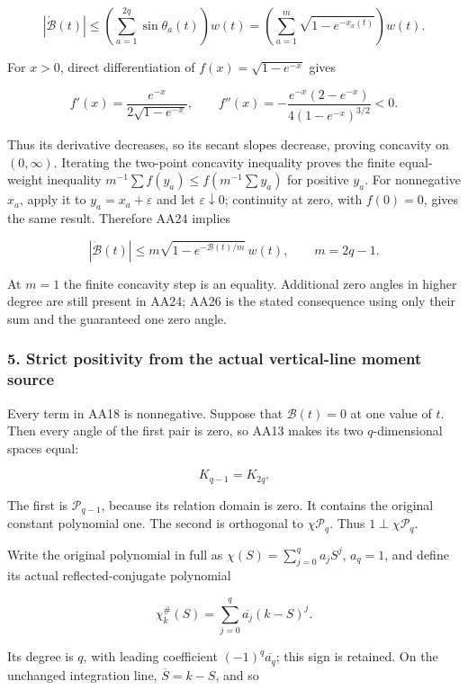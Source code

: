 \[
|\dot{\mathcal B}(t)|
\le\left(\sum_{a=1}^{2q}\sin\theta_a(t)\right)w(t)
=\left(\sum_{a=1}^{m}\sqrt{1-e^{-x_a(t)}}\right)w(t).
\tag{AA24}
\]

For \(x>0\), direct differentiation of \(f(x)=\sqrt{1-e^{-x}}\) gives

\[
f'(x)=\frac{e^{-x}}{2\sqrt{1-e^{-x}}},\qquad
f''(x)=-\frac{e^{-x}(2-e^{-x})}{4(1-e^{-x})^{3/2}}<0.
\tag{AA25}
\]

Thus its derivative decreases, so its secant slopes decrease, proving concavity on \((0,\infty)\). Iterating the two-point concavity inequality proves the finite equal-weight inequality \(m^{-1}\sum f(y_a)\le f(m^{-1}\sum y_a)\) for positive \(y_a\). For nonnegative \(x_a\), apply it to \(y_a=x_a+\varepsilon\) and let \(\varepsilon\downarrow0\); continuity at zero, with \(f(0)=0\), gives the same result. Therefore AA24 implies

\[
\boxed{
|\dot{\mathcal B}(t)|
\le m\sqrt{1-e^{-\mathcal B(t)/m}}\,w(t),
\qquad m=2q-1.
}
\tag{AA26}
\]

At \(m=1\) the finite concavity step is an equality. Additional zero angles in higher degree are still present in AA24; AA26 is the stated consequence using only their sum and the guaranteed one zero angle.

\subsubsection{5. Strict positivity from the actual vertical-line moment source}\label{endpoint-all_degree_angle_review--strict-positivity-from-the-actual-vertical-line-moment-source}

Every term in AA18 is nonnegative. Suppose that \(\mathcal B(t)=0\) at one value of \(t\). Then every angle of the first pair is zero, so AA13 makes its two \(q\)-dimensional spaces equal:

\[
K_{q-1}=K_{2q}.
\tag{AA27}
\]

The first is \(\mathcal P_{q-1}\), because its relation domain is zero. It contains the original constant polynomial one. The second is orthogonal to \(\chi\mathcal P_q\). Thus \(1\perp\chi\mathcal P_q\).

Write the original polynomial in full as \(\chi(S)=\sum_{j=0}^q a_jS^j\), \(a_q=1\), and define its actual reflected-conjugate polynomial

\[
\chi_k^{\#}(S)=\sum_{j=0}^q\overline{a_j}(k-S)^j.
\tag{AA28}
\]

Its degree is \(q\), with leading coefficient \((-1)^q\overline{a_q}\); this sign is retained. On the unchanged integration line, \(\overline S=k-S\), and so


